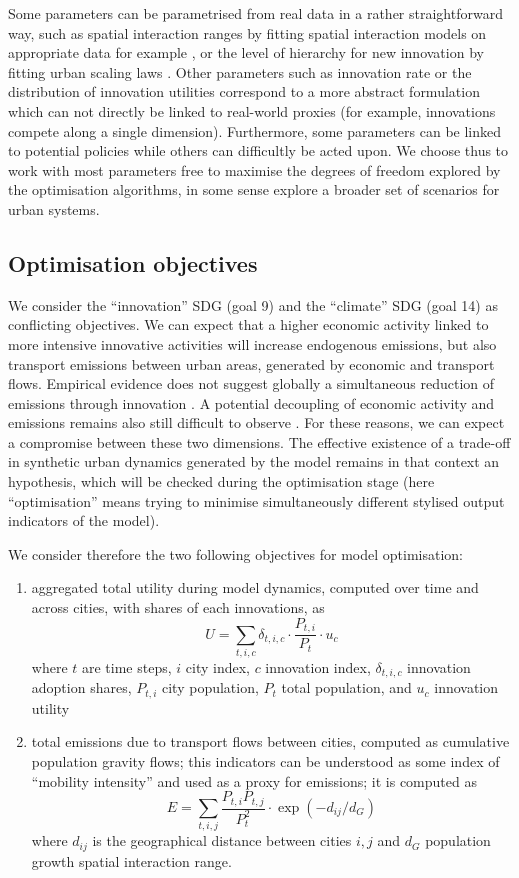 \documentclass[final,5p,times,twocolumn,authoryear]{elsarticle}
\begin{document}
Some parameters can be parametrised from real data in a rather straightforward way, such as spatial interaction ranges by fitting spatial interaction models on appropriate data for example \citep{fotheringham1989spatial}, or the level of hierarchy for new innovation by fitting urban scaling laws \citep{pumain2006evolutionary}. Other parameters such as innovation rate or the distribution of innovation utilities correspond to a more abstract formulation which can not directly be linked to real-world proxies (for example, innovations compete along a single dimension). Furthermore, some parameters can be linked to potential policies while others can difficultly be acted upon. We choose thus to work with most parameters free to maximise the degrees of freedom explored by the optimisation algorithms, in some sense explore a broader set of scenarios for urban systems.


\subsection{Optimisation objectives}

We consider the ``innovation'' SDG (goal 9) and the ``climate'' SDG (goal 14) as conflicting objectives. We can expect that a higher economic activity linked to more intensive innovative activities will increase endogenous emissions, but also transport emissions between urban areas, generated by economic and transport flows. Empirical evidence does not suggest globally a simultaneous reduction of emissions through innovation \citep{chen2020does}. A potential decoupling of economic activity and emissions remains also still difficult to observe \citep{haberl2020systematic}. For these reasons, we can expect a compromise between these two dimensions. The effective existence of a trade-off in synthetic urban dynamics generated by the model remains in that context an hypothesis, which will be checked during the optimisation stage (here ``optimisation'' means trying to minimise simultaneously different stylised output indicators of the model).

We consider therefore the two following objectives for model optimisation:

\begin{enumerate}
 \item aggregated total utility during model dynamics, computed over time and across cities, with shares of each innovations, as
 \[
 U = \sum_{t,i,c} \delta_{t,i,c} \cdot \frac{P_{t,i}}{P_t} \cdot u_c
 \]
 where $t$ are time steps, $i$ city index, $c$ innovation index, $\delta_{t,i,c}$ innovation adoption shares, $P_{t,i}$ city population, $P_t$ total population, and $u_c$ innovation utility
 \item total emissions due to transport flows between cities, computed as cumulative population gravity flows; this indicators can be understood as some index of ``mobility intensity'' and used as a proxy for emissions; it is computed as
 \[
 E = \sum_{t,i,j} \frac{P_{t,i}P_{t,j}}{P_t^2} \cdot \exp\left(- d_{ij} / d_G\right)
 \]
 where $d_{ij}$ is the geographical distance between cities $i,j$ and $d_G$ population growth spatial interaction range.
\end{enumerate}
\end{document}
